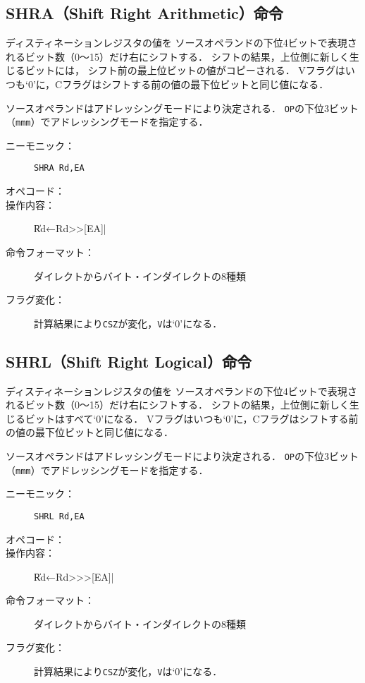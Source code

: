 \subsection{SHRA（Shift Right Arithmetic）命令}
ディスティネーションレジスタの値を
ソースオペランドの下位4ビットで表現されるビット数（0〜15）だけ右にシフトする．
シフトの結果，上位側に新しく生じるビットには，
シフト前の最上位ビットの値がコピーされる．
Vフラグはいつも`0'に，Cフラグはシフトする前の値の最下位ビットと同じ値になる．

ソースオペランドはアドレッシングモードにより決定される．
\texttt{OP}の下位3ビット（\texttt{mmm}）でアドレッシングモードを指定する．

\begin{description}
\item[ニーモニック：] \texttt{SHRA Rd,EA}
\item[オペコード：] 
\item[操作内容：] \|Rd←Rd>>[EA]|
\item[命令フォーマット：] ダイレクトからバイト・インダイレクトの8種類
\item[フラグ変化：] 計算結果により\texttt{CSZ}が変化，\texttt{V}は`0'になる．
\end{description}

\subsection{SHRL（Shift Right Logical）命令}
ディスティネーションレジスタの値を
ソースオペランドの下位4ビットで表現されるビット数（0〜15）だけ右にシフトする．
シフトの結果，上位側に新しく生じるビットはすべて`0'になる．
Vフラグはいつも`0'に，Cフラグはシフトする前の値の最下位ビットと同じ値になる．

ソースオペランドはアドレッシングモードにより決定される．
\texttt{OP}の下位3ビット（\texttt{mmm}）でアドレッシングモードを指定する．

\begin{description}
\item[ニーモニック：] \texttt{SHRL Rd,EA}
\item[オペコード：] 
\item[操作内容：] \|Rd←Rd>>>[EA]|
\item[命令フォーマット：] ダイレクトからバイト・インダイレクトの8種類
\item[フラグ変化：] 計算結果により\texttt{CSZ}が変化，\texttt{V}は`0'になる．
\end{description}

